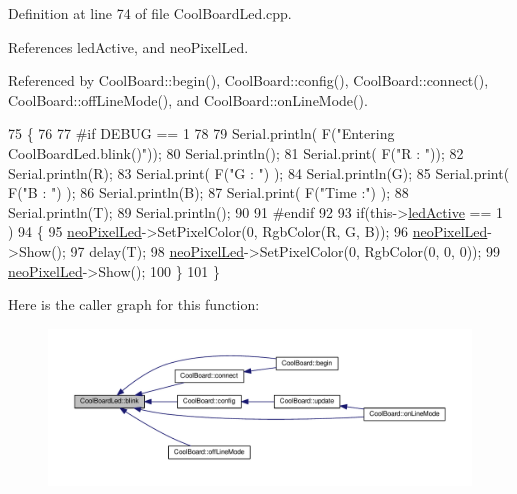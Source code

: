 Definition at line 74 of file Cool\+Board\+Led.\+cpp.



References led\+Active, and neo\+Pixel\+Led.



Referenced by Cool\+Board\+::begin(), Cool\+Board\+::config(), Cool\+Board\+::connect(), Cool\+Board\+::off\+Line\+Mode(), and Cool\+Board\+::on\+Line\+Mode().


\begin{DoxyCode}
75 \{
76 
77 \textcolor{preprocessor}{#if DEBUG == 1}
78 
79     Serial.println( F(\textcolor{stringliteral}{"Entering CoolBoardLed.blink()"}));
80     Serial.println();
81     Serial.print( F(\textcolor{stringliteral}{"R : "}));
82     Serial.println(R);
83     Serial.print( F(\textcolor{stringliteral}{"G : "}) );
84     Serial.println(G);
85     Serial.print( F(\textcolor{stringliteral}{"B : "}) );
86     Serial.println(B);
87     Serial.print( F(\textcolor{stringliteral}{"Time :"}) );
88     Serial.println(T);
89     Serial.println();
90 
91 \textcolor{preprocessor}{#endif  }
92 
93     \textcolor{keywordflow}{if}(this->\hyperlink{classCoolBoardLed_a5f17c135516fcf4b44ea8a096ba0177a}{ledActive} == 1 )
94     \{
95         \hyperlink{classCoolBoardLed_ac2c13fa462a010cd9242bf297c013923}{neoPixelLed}->SetPixelColor(0, RgbColor(R, G, B));
96         \hyperlink{classCoolBoardLed_ac2c13fa462a010cd9242bf297c013923}{neoPixelLed}->Show();
97         delay(T);
98         \hyperlink{classCoolBoardLed_ac2c13fa462a010cd9242bf297c013923}{neoPixelLed}->SetPixelColor(0, RgbColor(0, 0, 0));
99         \hyperlink{classCoolBoardLed_ac2c13fa462a010cd9242bf297c013923}{neoPixelLed}->Show();
100     \}
101 \}
\end{DoxyCode}
Here is the caller graph for this function\+:
\nopagebreak
\begin{figure}[H]
\begin{center}
\leavevmode
\includegraphics[width=350pt]{classCoolBoardLed_a96e1ea13003eee34c9dbcef340404426_icgraph}
\end{center}
\end{figure}
\mbox{\label{classCoolBoardLed_a1b60e5e30bea96c49ed62ed1bf1ffc8b}} 
